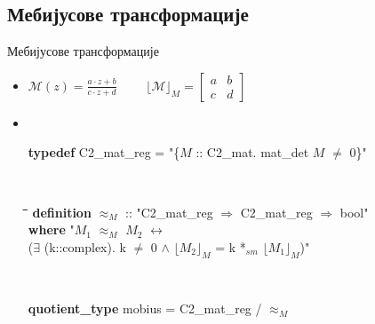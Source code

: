 \documentclass[slidestop, compress, mathserif, containsverbatim, xcolor=dvipsnames]{beamer}
\newcommand{\Reprm}[1]{\ensuremath{\lfloor#1\rfloor_{M}}}
\newcommand{\approxrm}{\ensuremath{\approx_{M}}}
\begin{document}
\subsection*{Мебијусове трансформације}

\begin{frame}{Мебијусове трансформације}
  \begin{itemize}
  \item $\mathcal{M}(z) = \frac{a\cdot z + b}{c\cdot z + d}$ \ \ \ \ 
        $\Reprm{\mathcal{M}} = \begin{bmatrix} a & b \\ c & d \end{bmatrix}$ 
  \vfill
  \item \begin{footnotesize} {\tt
    \begin{tabbing}
      {\bf typedef} C2\_mat\_reg = "\{$M$ :: C2\_mat. mat\_det $M$ $\neq$ 0\}"
    \end{tabbing}
  }
    {\tt
      \begin{tabbing}
        \hspace{5mm}\=\hspace{5mm}\=\hspace{5mm}\=\hspace{5mm}\=\hspace{5mm}\=\kill
        {\bf definition} $\approxrm$ :: "{}C2\_mat\_reg $\Rightarrow$ C2\_mat\_reg $\Rightarrow$ bool"\\ 
        \> {\bf where} "$M_1$ $\approxrm$ $M_2$ $\longleftrightarrow$ \\
        \>\> ($\exists$ (k::complex). k $\neq$ 0 $\wedge$ $\Reprm{M_2}$ = k *$_{sm}$ $\Reprm{M_1}$)"
      \end{tabbing}
    }
    {\tt
      \begin{tabbing}
        {\bf quotient\_type} mobius = C2\_mat\_reg / $\approxrm$
      \end{tabbing}
    }  \end{footnotesize} 
  \end{itemize} \vfill
\end{frame}
\end{document}
